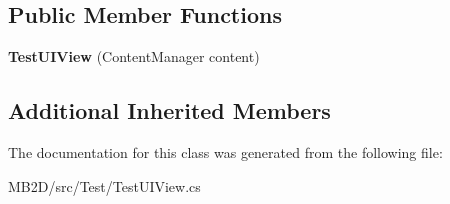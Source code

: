 \subsection*{Public Member Functions}
\begin{DoxyCompactItemize}
\item 
\hypertarget{class_m_b2_d_1_1_testing_1_1_test_u_i_view_a824c843e55949ace7e7b97179b4edb81}{}\label{class_m_b2_d_1_1_testing_1_1_test_u_i_view_a824c843e55949ace7e7b97179b4edb81} 
{\bfseries Test\+U\+I\+View} (Content\+Manager content)
\end{DoxyCompactItemize}
\subsection*{Additional Inherited Members}


The documentation for this class was generated from the following file\+:\begin{DoxyCompactItemize}
\item 
M\+B2\+D/src/\+Test/Test\+U\+I\+View.\+cs\end{DoxyCompactItemize}
